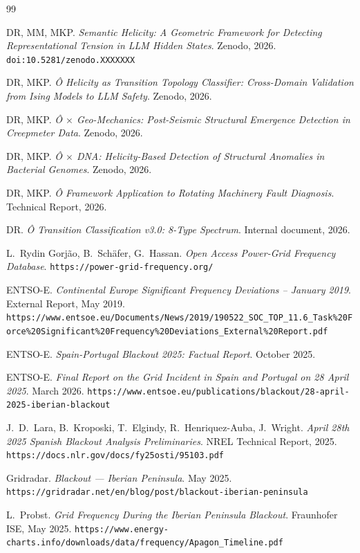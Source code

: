 \documentclass[11pt,a4paper]{article}
\begin{document}
\begin{thebibliography}{99}

DR, MM, MKP. \textit{Semantic Helicity: A Geometric Framework for Detecting Representational Tension in LLM Hidden States}. Zenodo, 2026. \texttt{doi:10.5281/zenodo.XXXXXXX}

DR, MKP. \textit{Ô Helicity as Transition Topology Classifier: Cross-Domain Validation from Ising Models to LLM Safety}. Zenodo, 2026.

DR, MKP. \textit{Ô $\times$ Geo-Mechanics: Post-Seismic Structural Emergence Detection in Creepmeter Data}. Zenodo, 2026.

DR, MKP. \textit{Ô $\times$ DNA: Helicity-Based Detection of Structural Anomalies in Bacterial Genomes}. Zenodo, 2026.

DR, MKP. \textit{Ô Framework Application to Rotating Machinery Fault Diagnosis}. Technical Report, 2026.

DR. \textit{Ô Transition Classification v3.0: 8-Type Spectrum}. Internal document, 2026.

L.\ Rydin Gorjão, B.\ Schäfer, G.\ Hassan. \textit{Open Access Power-Grid Frequency Database}. \texttt{https://power-grid-frequency.org/}

ENTSO-E. \textit{Continental Europe Significant Frequency Deviations -- January 2019}. External Report, May 2019. \texttt{https://www.entsoe.eu/Documents/News/2019/190522\_SOC\_TOP\_11.6\_Task\%20Force\%20Significant\%20Frequency\%20Deviations\_External\%20Report.pdf}

ENTSO-E. \textit{Spain-Portugal Blackout 2025: Factual Report}. October 2025.

ENTSO-E. \textit{Final Report on the Grid Incident in Spain and Portugal on 28 April 2025}. March 2026. \texttt{https://www.entsoe.eu/publications/blackout/28-april-2025-iberian-blackout}

J.\ D.\ Lara, B.\ Kroposki, T.\ Elgindy, R.\ Henriquez-Auba, J.\ Wright. \textit{April 28th 2025 Spanish Blackout Analysis Preliminaries}. NREL Technical Report, 2025. \texttt{https://docs.nlr.gov/docs/fy25osti/95103.pdf}

Gridradar. \textit{Blackout --- Iberian Peninsula}. May 2025. \texttt{https://gridradar.net/en/blog/post/blackout-iberian-peninsula}

L.\ Probst. \textit{Grid Frequency During the Iberian Peninsula Blackout}. Fraunhofer ISE, May 2025. \texttt{https://www.energy-charts.info/downloads/data/frequency/Apagon\_Timeline.pdf}

\end{thebibliography}
\end{document}
